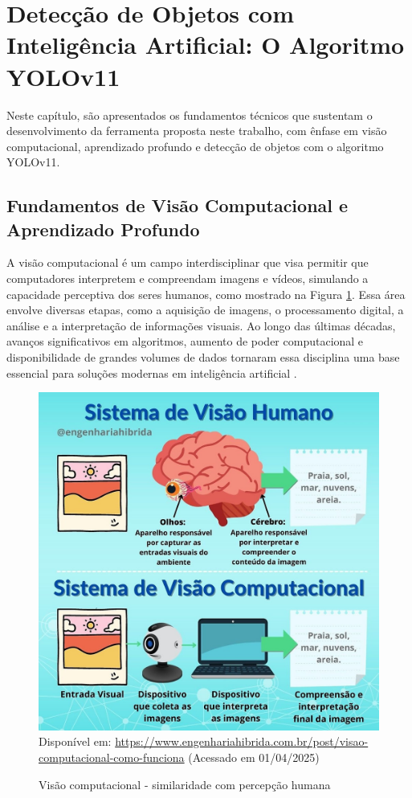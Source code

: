 \section{Detecção de Objetos com Inteligência Artificial: O Algoritmo YOLOv11}

Neste capítulo, são apresentados os fundamentos técnicos que sustentam o desenvolvimento da ferramenta proposta neste trabalho, com ênfase em visão computacional, aprendizado profundo e detecção de objetos com o algoritmo YOLOv11.

\subsection{Fundamentos de Visão Computacional e Aprendizado Profundo}

A visão computacional é um campo interdisciplinar que visa permitir que computadores interpretem e compreendam imagens e vídeos, simulando a capacidade perceptiva dos seres humanos, como mostrado na Figura \ref{fg-visao-computacional}. Essa área envolve diversas etapas, como a aquisição de imagens, o processamento digital, a análise e a interpretação de informações visuais. Ao longo das últimas décadas, avanços significativos em algoritmos, aumento de poder computacional e disponibilidade de grandes volumes de dados tornaram essa disciplina uma base essencial para soluções modernas em inteligência artificial  \cite{szeliski2022}.

\begin{figure}[htbp]
  \centering
  \caption{Visão computacional - similaridade com percepção humana}
  \includegraphics[width=0.8 \textwidth]{Figuras/visao-computacional.jpg}
  \\
  Disponível em: \url{https://www.engenhariahibrida.com.br/post/visao-computacional-como-funciona} (Acessado em 01/04/2025)
  \label{fg-visao-computacional}
\end{figure}

